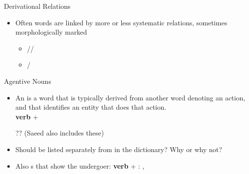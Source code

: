 \documentclass{beamer}
\begin{document}
\begin{frame}{Derivational Relations}

\begin{itemize}
\item Often words are linked by more or less systematic relations, sometimes morphologically marked
  \begin{itemize}
  \item {}//
  \item {}/
  \end{itemize}
\end{itemize}
\end{frame}

\begin{frame}{Agentive Nouns}
\MyLogo{}
\begin{itemize}
\item An  is a word that is typically derived from
  another word denoting an action, and that identifies an entity that
  does that action.  \\ \textbf{verb} + 
  \begin{exe}
    \ex {}
    \ex ??  (Saeed also includes these)
  \end{exe}
\item Should  be listed separately from  in
the dictionary? Why or why not?
\item Also s that show the undergoer:
  \textbf{verb} + : , 
\end{itemize}
\end{frame}
\end{document}
